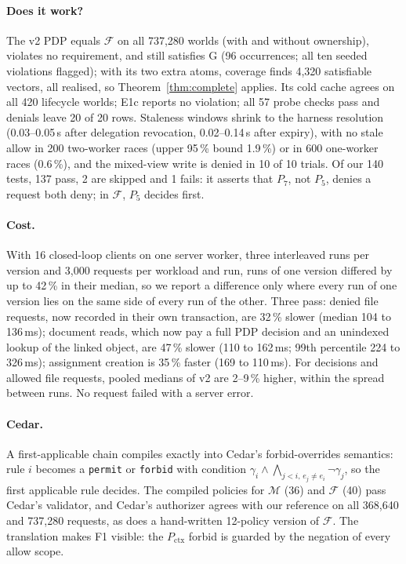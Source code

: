 \documentclass[sigconf,review,anonymous]{acmart}
\newcommand{\Px}{P_{\mathrm{ctx}}}
\begin{document}
\paragraph{Does it work?} The v2 PDP equals $\mathcal{F}$ on all 737{,}280 worlds (with and without ownership),
violates no requirement, and still satisfies G (96 occurrences; all ten seeded violations flagged); with its two
extra atoms, coverage finds 4{,}320 satisfiable vectors, all realised, so Theorem~\ref{thm:complete} applies. Its cold
cache agrees on all 420 lifecycle worlds; E1c reports no violation; all 57 probe checks pass and denials leave 20 of
20 rows. Staleness windows shrink to the harness resolution (0.03--0.05\,s after delegation revocation,
0.02--0.14\,s after expiry), with no stale allow in 200 two-worker races (upper 95\,\% bound 1.9\,\%) or in 600
one-worker races (0.6\,\%), and the mixed-view write is denied in 10 of 10 trials. Of our 140 tests, 137 pass, 2 are
skipped and 1 fails: it asserts that $P_7$, not $P_5$, denies a request both deny; in $\mathcal{F}$, $P_5$ decides
first.

\paragraph{Cost.} With 16 closed-loop clients on one server worker, three interleaved runs per version and 3{,}000
requests per workload and run, runs of one version differed by up to 42\,\% in their median, so we report a difference
only where every run of one version lies on the same side of every run of the other. Three pass: denied file requests, now recorded in their own transaction, are 32\,\% slower (median 104 to 136\,ms); document
reads, which now pay a full PDP decision and an unindexed lookup of the linked object, are 47\,\% slower (110 to
162\,ms; 99th percentile 224 to 326\,ms); assignment creation is 35\,\% faster (169 to 110\,ms). For decisions and
allowed file requests, pooled medians of v2 are 2--9\,\% higher, within the spread between runs. No request failed
with a server error.

\paragraph{Cedar.} A first-applicable chain compiles exactly into Cedar's forbid-overrides semantics: rule $i$
becomes a \texttt{permit} or \texttt{forbid} with condition
$\gamma_i\wedge\bigwedge_{j<i,\,e_j\neq e_i}\neg\gamma_j$, so the first applicable rule decides. The compiled policies for $\mathcal{M}$ (36) and $\mathcal{F}$ (40) pass Cedar's validator, and Cedar's authorizer
agrees with our reference on all 368{,}640 and 737{,}280 requests, as does a hand-written 12-policy version of
$\mathcal{F}$. The translation makes F1 visible: the $\Px$ forbid is guarded by the negation of every allow scope.
\end{document}
